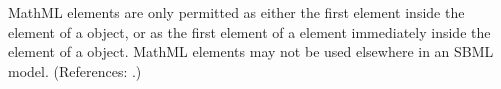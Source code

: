 MathML  elements are only permitted as either the first
element inside the  element of a \FunctionDefinition object, or
as the first element of a  element immediately inside the
 element of a \FunctionDefinition object.  MathML
 elements may not be used elsewhere in an SBML model.
(References: .)

